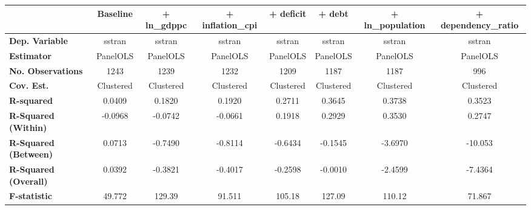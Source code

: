 \begin{center}
\begin{tabular}{lccccccc}
\toprule
                                   & \textbf{Baseline} & \textbf{+ ln\_gdppc} & \textbf{+ inflation\_cpi} & \textbf{+ deficit} & \textbf{+ debt} & \textbf{+ ln\_population} & \textbf{+ dependency\_ratio}  \\
\midrule
\textbf{Dep. Variable}             &       sstran      &        sstran        &           sstran          &       sstran       &      sstran     &           sstran          &            sstran             \\
\textbf{Estimator}                 &      PanelOLS     &       PanelOLS       &          PanelOLS         &      PanelOLS      &     PanelOLS    &          PanelOLS         &           PanelOLS            \\
\textbf{No. Observations}          &        1243       &         1239         &            1232           &        1209        &       1187      &            1187           &             996               \\
\textbf{Cov. Est.}                 &     Clustered     &      Clustered       &         Clustered         &     Clustered      &    Clustered    &         Clustered         &          Clustered            \\
\textbf{R-squared}                 &       0.0409      &        0.1820        &           0.1920          &       0.2711       &      0.3645     &           0.3738          &            0.3523             \\
\textbf{R-Squared (Within)}        &      -0.0968      &       -0.0742        &          -0.0661          &       0.1918       &      0.2929     &           0.3530          &            0.2747             \\
\textbf{R-Squared (Between)}       &       0.0713      &       -0.7490        &          -0.8114          &      -0.6434       &     -0.1545     &          -3.6970          &           -10.053             \\
\textbf{R-Squared (Overall)}       &       0.0392      &       -0.3821        &          -0.4017          &      -0.2598       &     -0.0010     &          -2.4599          &           -7.4364             \\
\textbf{F-statistic}               &       49.772      &        129.39        &           91.511          &       105.18       &      127.09     &           110.12          &            71.867             \\

\end{tabular}
\end{center}
